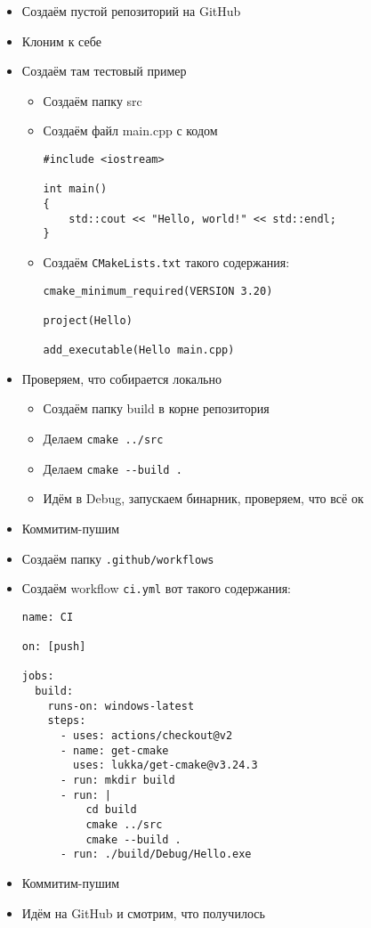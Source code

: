 \documentclass{../../text-style}
\begin{document}
\maketitle
\thispagestyle{empty}

\begin{itemize}
    \item Создаём пустой репозиторий на GitHub
    \item Клоним к себе
    \item Создаём там тестовый пример
    \begin{itemize}
        \item Создаём папку src
        \item Создаём файл main.cpp с кодом
            \begin{verbatim}
#include <iostream>

int main() 
{
    std::cout << "Hello, world!" << std::endl;
}
            \end{verbatim}
        \item Создаём \verb|CMakeLists.txt| такого содержания:
            \begin{verbatim}
cmake_minimum_required(VERSION 3.20)

project(Hello)

add_executable(Hello main.cpp)
            \end{verbatim}
    \end{itemize}
    \item Проверяем, что собирается локально
    \begin{itemize}
        \item Создаём папку build в корне репозитория
        \item Делаем \verb|cmake ../src|
        \item Делаем \verb|cmake --build .|
        \item Идём в Debug, запускаем бинарник, проверяем, что всё ок
    \end{itemize}
    \item Коммитим-пушим
    \item Создаём папку \verb|.github/workflows|
    \item Создаём workflow \verb|ci.yml| вот такого содержания:
    \begin{verbatim}
name: CI

on: [push]

jobs:
  build:
    runs-on: windows-latest
    steps:
      - uses: actions/checkout@v2
      - name: get-cmake
        uses: lukka/get-cmake@v3.24.3
      - run: mkdir build
      - run: |
          cd build 
          cmake ../src
          cmake --build .
      - run: ./build/Debug/Hello.exe
    \end{verbatim}
    \item Коммитим-пушим
    \item Идём на GitHub и смотрим, что получилось
\end{itemize}
\end{document}
